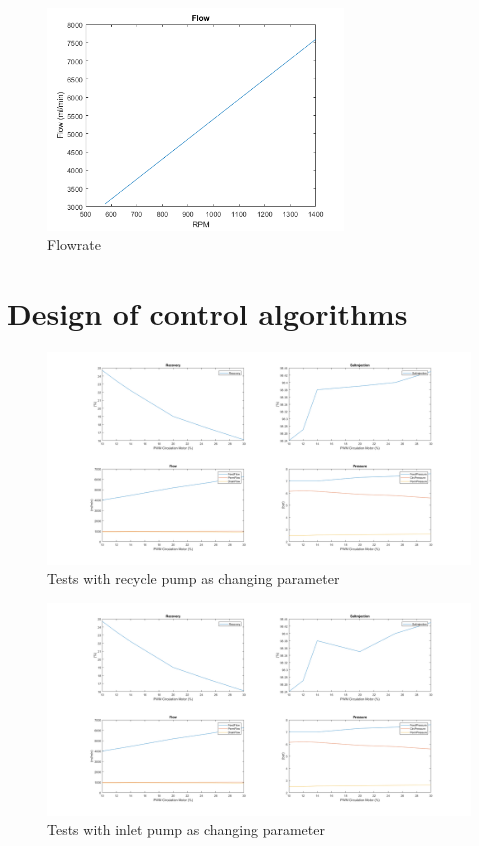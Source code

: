\begin{figure}[h]
    \centering
    \includegraphics[width=0.7\textwidth]{Flow.png}
    \caption{Flowrate}
    \label{fig:Flowrate}
\end{figure}


\section{Design of control algorithms}

\begin{figure}[h]
    \centering
    \includegraphics[width=1.65\textwidth, angle = 270]{PreTestReg1.png}
    \caption{Tests with recycle pump as changing parameter}
    \label{fig:PreTestReg1}
\end{figure}

\begin{figure}[h]
    \centering 
    \includegraphics[width=1.65\textwidth, angle=270]{PreTestReg3.png}
    \caption{Tests with inlet pump as changing parameter}
    \label{fig:PreTestReg3}
\end{figure}





